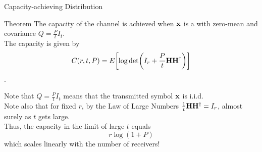 \begin{frame}[allowframebreaks]{Capacity-achieving Distribution}
\framebreak

\begin{alertblock}{Theorem}
	The capacity of the channel is achieved when $\vb{x}$ is a \cscg{} with zero-mean and covariance $Q=\frac{P}{t}I_t$.\\
	The capacity is given by
	$$C(r,t,P) = E_{}\qty[\log\det(I_r + \frac{P}{t}\vb{H\ensuremath{H^\dagger}})]$$.
\end{alertblock}

Note that $Q=\frac{P}{t}I_t$ means that the transmitted symbol $\vb{x}$ is i.i.d.\\
Note also that for fixed $r$, by the Law of Large Numbers $\frac{1}{t}\vb{H\ensuremath{H^\dagger}} = I_r$, almost surely as $t$ gets large.\\ Thus, the capacity in the limit of large $t$ equals
$$r\log(1+P)$$
which scales linearly with the number of receivers!

\end{frame}

